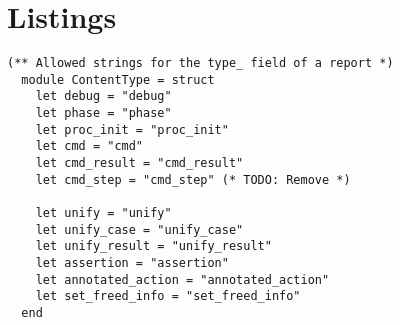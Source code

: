 
\appendix
\chapter{Listings}

\begin{lstlisting}[caption={
  \texttt{loggingConstants.ml}
  \label{lst:loggingconstants}}, style=code]
  (** Allowed strings for the type_ field of a report *)
  module ContentType = struct
    let debug = "debug"
    let phase = "phase"
    let proc_init = "proc_init"
    let cmd = "cmd"
    let cmd_result = "cmd_result"
    let cmd_step = "cmd_step" (* TODO: Remove *)

    let unify = "unify"
    let unify_case = "unify_case"
    let unify_result = "unify_result"
    let assertion = "assertion"
    let annotated_action = "annotated_action"
    let set_freed_info = "set_freed_info"
  end
\end{lstlisting}

